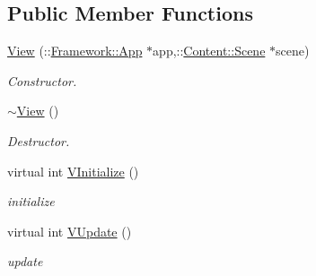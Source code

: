 \subsection*{Public Member Functions}
\begin{DoxyCompactItemize}
\item 
\hypertarget{classContent_1_1View_a46201d305005dd0fd3e97bb606243ae5}{
\hyperlink{classContent_1_1View_a46201d305005dd0fd3e97bb606243ae5}{View} (::\hyperlink{classFramework_1_1App}{Framework::App} $\ast$app,::\hyperlink{classContent_1_1Scene}{Content::Scene} $\ast$scene)}
\label{classContent_1_1View_a46201d305005dd0fd3e97bb606243ae5}

\begin{DoxyCompactList}\small\item\em Constructor. \item\end{DoxyCompactList}\item 
\hypertarget{classContent_1_1View_a6cf083b8cf06e2bc569b9e5077e4b242}{
\hyperlink{classContent_1_1View_a6cf083b8cf06e2bc569b9e5077e4b242}{$\sim$View} ()}
\label{classContent_1_1View_a6cf083b8cf06e2bc569b9e5077e4b242}

\begin{DoxyCompactList}\small\item\em Destructor. \item\end{DoxyCompactList}\item 
\hypertarget{classContent_1_1View_ace8cacb0bc55e48ebb2ea923ae54e56b}{
virtual int \hyperlink{classContent_1_1View_ace8cacb0bc55e48ebb2ea923ae54e56b}{VInitialize} ()}
\label{classContent_1_1View_ace8cacb0bc55e48ebb2ea923ae54e56b}

\begin{DoxyCompactList}\small\item\em initialize \item\end{DoxyCompactList}\item 
\hypertarget{classContent_1_1View_a2809a8ff75ead75cfb3f5050751cac26}{
virtual int \hyperlink{classContent_1_1View_a2809a8ff75ead75cfb3f5050751cac26}{VUpdate} ()}
\label{classContent_1_1View_a2809a8ff75ead75cfb3f5050751cac26}

\begin{DoxyCompactList}\small\item\em update \item\end{DoxyCompactList}\end{DoxyCompactItemize}

